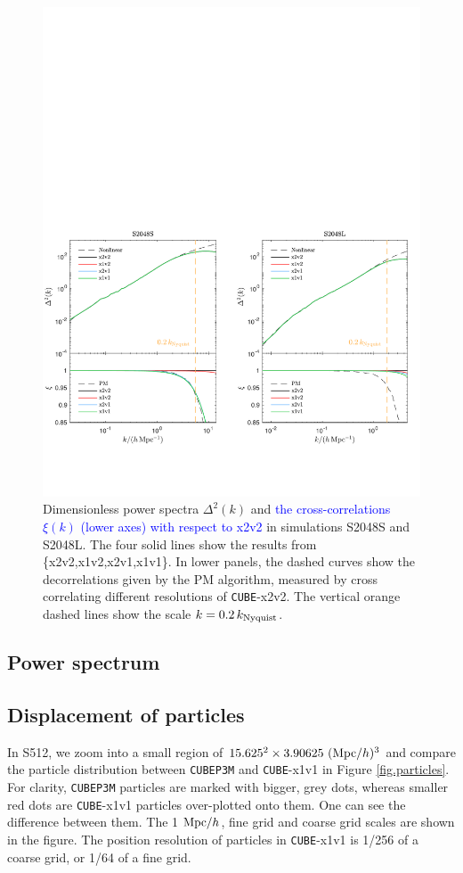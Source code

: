 \documentclass[10pt,twocolumn,preprint]{emulateapj}
\newcommand{\tcb}{\textcolor{blue}}
\begin{document}
\begin{figure}
\centering
  \includegraphics[width=1.0\linewidth]{f9}
 \caption{Dimensionless power spectra $\Delta^2(k)$ and \tcb{the cross-correlations $\xi(k)$ (lower axes) with respect to x2v2} in simulations S2048S and S2048L. The four solid lines show the results from \{x2v2,x1v2,x2v1,x1v1\}. In lower panels, the dashed curves show the decorrelations given by the PM algorithm, measured by cross correlating different resolutions of {\tt CUBE}-x2v2. The vertical orange dashed lines show the scale $k=0.2\, k_{\rm Nyquist}$.}
\label{fig.ccc}
\end{figure}
\subsection{Power spectrum}

\subsection{Displacement of particles}
In S512, we zoom into a small region of $15.625^2\times 3.90625\ ({\rm Mpc}/h)^3$ and compare the particle distribution between {\tt CUBEP3M} and {\tt CUBE}-x1v1 in Figure \ref{fig.particles}. For clarity, {\tt CUBEP3M} particles are marked with bigger, grey dots, whereas smaller red dots are {\tt CUBE}-x1v1 particles over-plotted onto them. One can see the difference between them. The 1 ${\rm Mpc}/h$, fine grid and coarse grid scales are shown in the figure. The position resolution of particles in {\tt CUBE}-x1v1 is 1/256 of a coarse grid, or 1/64 of a fine grid.
\end{document}
